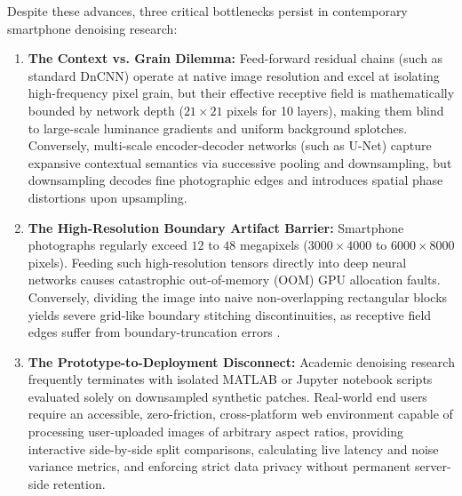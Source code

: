 \documentclass{ieeeaccess}
\begin{document}
Despite these advances, three critical bottlenecks persist in contemporary smartphone denoising research:
\begin{enumerate}
    \item \textbf{The Context vs. Grain Dilemma:} Feed-forward residual chains (such as standard DnCNN) operate at native image resolution and excel at isolating high-frequency pixel grain, but their effective receptive field is mathematically bounded by network depth ($21 \times 21$ pixels for 10 layers), making them blind to large-scale luminance gradients and uniform background splotches. Conversely, multi-scale encoder-decoder networks (such as U-Net) capture expansive contextual semantics via successive pooling and downsampling, but downsampling decodes fine photographic edges and introduces spatial phase distortions upon upsampling.
    \item \textbf{The High-Resolution Boundary Artifact Barrier:} Smartphone photographs regularly exceed $12$ to $48$ megapixels ($3000 \times 4000$ to $6000 \times 8000$ pixels). Feeding such high-resolution tensors directly into deep neural networks causes catastrophic out-of-memory (OOM) GPU allocation faults. Conversely, dividing the image into naive non-overlapping rectangular blocks yields severe grid-like boundary stitching discontinuities, as receptive field edges suffer from boundary-truncation errors \cite{huang2021evaluation}.
    \item \textbf{The Prototype-to-Deployment Disconnect:} Academic denoising research frequently terminates with isolated MATLAB or Jupyter notebook scripts evaluated solely on downsampled synthetic patches. Real-world end users require an accessible, zero-friction, cross-platform web environment capable of processing user-uploaded images of arbitrary aspect ratios, providing interactive side-by-side split comparisons, calculating live latency and noise variance metrics, and enforcing strict data privacy without permanent server-side retention.
\end{enumerate}
\end{document}
